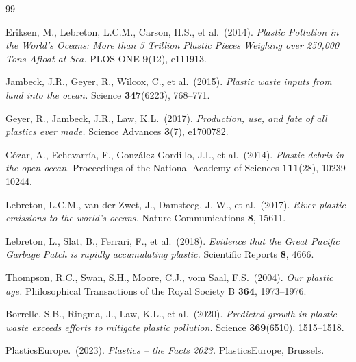 ﻿\documentclass[12pt,a4paper]{article}
\theoremstyle{definition}
\theoremstyle{remark}
\begin{document}
\begin{thebibliography}{99}

Eriksen, M., Lebreton, L.C.M., Carson, H.S., et al.\ (2014).
\textit{Plastic Pollution in the World's Oceans: More than 5 Trillion Plastic
Pieces Weighing over 250,000 Tons Afloat at Sea.}
PLOS ONE \textbf{9}(12), e111913.

Jambeck, J.R., Geyer, R., Wilcox, C., et al.\ (2015).
\textit{Plastic waste inputs from land into the ocean.}
Science \textbf{347}(6223), 768--771.

Geyer, R., Jambeck, J.R., Law, K.L.\ (2017).
\textit{Production, use, and fate of all plastics ever made.}
Science Advances \textbf{3}(7), e1700782.

C\'ozar, A., Echevarr\'ia, F., Gonz\'alez-Gordillo, J.I., et al.\ (2014).
\textit{Plastic debris in the open ocean.}
Proceedings of the National Academy of Sciences \textbf{111}(28), 10239--10244.

Lebreton, L.C.M., van der Zwet, J., Damsteeg, J.-W., et al.\ (2017).
\textit{River plastic emissions to the world's oceans.}
Nature Communications \textbf{8}, 15611.

Lebreton, L., Slat, B., Ferrari, F., et al.\ (2018).
\textit{Evidence that the Great Pacific Garbage Patch is rapidly accumulating plastic.}
Scientific Reports \textbf{8}, 4666.

Thompson, R.C., Swan, S.H., Moore, C.J., vom Saal, F.S.\ (2004).
\textit{Our plastic age.}
Philosophical Transactions of the Royal Society B \textbf{364}, 1973--1976.

Borrelle, S.B., Ringma, J., Law, K.L., et al.\ (2020).
\textit{Predicted growth in plastic waste exceeds efforts to mitigate plastic pollution.}
Science \textbf{369}(6510), 1515--1518.

PlasticsEurope.\ (2023).
\textit{Plastics -- the Facts 2023.}
PlasticsEurope, Brussels.


\end{thebibliography}
\end{document}
